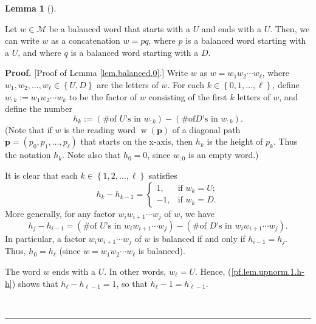 \documentclass[numbers=enddot,12pt,final,onecolumn,notitlepage]{scrartcl}%
\theoremstyle{definition}
\newtheorem{lem}[theo]{Lemma}
\newenvironment{lemma}[1][]
{\begin{lem}[#1]\begin{leftbar}}
{\end{leftbar}\end{lem}}
\newenvironment{proof}[1][Proof]{\noindent\textbf{#1.} }{\ \rule{0.5em}{0.5em}}
\newcommand{\M}{\mathcal{M}}
\newcommand{\pp}{\mathbf{p}}
\newcommand{\w}{\operatorname{w}}
\newcommand{\tup}[1]{\left( #1 \right)}
\newenvironment{verlong}{}{}
\begin{document}
\begin{verlong}
\begin{lemma}
\label{lem.balanced.0}
Let $w\in\M$ be a balanced word that starts
with a $U$ and ends with a $U$.
Then, we can write $w$ as a concatenation $w=pq$, where $p$ is a balanced word starting with a $U$, and where $q$ is a balanced word starting with a $D$.
\end{lemma}

\begin{proof}
[Proof of Lemma \ref{lem.balanced.0}.] Write $w$ as $w=w_{1}w_{2}\cdots
w_{\ell}$, where $w_{1},w_{2},\ldots,w_{\ell}\in\left\{  U,D\right\}  $ are
the letters of $w$. For each $k\in\left\{  0,1,\ldots,\ell\right\}  $, define
$w_{:k}:=w_{1}w_{2}\cdots w_{k}$ to be the factor of $w$ consisting of the
first $k$ letters of $w$, and define the number%
\[
h_{k}:=\left(  \text{\# of }U\text{'s in }w_{:k}\right)  -\left(  \text{\# of
}D\text{'s in }w_{:k}\right)  .
\]
(Note that if $w$ is the reading word $\w\left(  \pp\right)$ of a
diagonal path $\pp = \tup{p_0, p_1, \ldots, p_\ell}$ that starts on the x-axis, then $h_{k}$ is the
height of $p_k$. Thus the notation $h_{k}$.
Note also that $h_0 = 0$, since $w_{:0}$ is an empty word.)

It is clear that each $k\in\left\{  1,2,\ldots,\ell\right\}  $ satisfies%
\begin{equation}
h_{k}-h_{k-1}=%
\begin{cases}
1, & \text{if }w_{k}=U;\\
-1, & \text{if }w_{k}=D.
\end{cases}
\label{pf.lem.upnorm.1.h-h}%
\end{equation}
More generally, for any factor $w_{i}w_{i+1}\cdots w_{j}$ of $w$, we have%
\begin{equation}
h_{j}-h_{i-1}=\left(  \text{\# of }U\text{'s in }w_{i}w_{i+1}\cdots
w_{j}\right)  -\left(  \text{\# of }D\text{'s in }w_{i}w_{i+1}\cdots
w_{j}\right)  .\label{pf.lem.upnorm.1.h-hgen}%
\end{equation}
In particular, a factor $w_{i}w_{i+1}\cdots w_{j}$ of $w$ is balanced if and
only if $h_{i-1}=h_{j}$. Thus, $h_{0}=h_{\ell}$ (since $w=w_{1}w_{2}\cdots
w_{\ell}$ is balanced).

The word $w$ ends with a $U$. In other words, $w_{\ell}=U$. Hence,
(\ref{pf.lem.upnorm.1.h-h}) shows that $h_{\ell}-h_{\ell-1}=1$, so that
$h_\ell - 1 = h_{\ell-1}$.


\end{proof}
\end{verlong}
\end{document}
